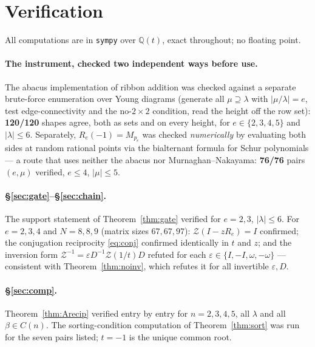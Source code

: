 \documentclass[11pt]{article}
\theoremstyle{definition}
\theoremstyle{remark}
\newcommand{\Q}{\mathbb{Q}}
\newcommand{\Mult}[1]{M_{#1}}
\newcommand{\Zc}{\mathcal{Z}}
\begin{document}
\section{Verification}\label{sec:verif}

All computations are in \texttt{sympy} over $\Q(t)$, exact throughout; no floating point.

\paragraph{The instrument, checked two independent ways before use.}
The abacus implementation of ribbon addition was checked against a separate brute-force
enumeration over Young diagrams (generate all $\mu\supseteq\lambda$ with $|\mu/\lambda|=e$,
test edge-connectivity and the no-$2\times2$ condition, read the height off the row set):
\textbf{120/120} shapes agree, both as sets and on every height, for $e\in\{2,3,4,5\}$ and
$|\lambda|\le6$.  Separately, $R_e(-1)=\Mult{p_e}$ was checked \emph{numerically} by
evaluating both sides at random rational points via the bialternant formula for Schur
polynomials --- a route that uses neither the abacus nor Murnaghan--Nakayama:
\textbf{76/76} pairs $(e,\mu)$ verified, $e\le4$, $|\mu|\le5$.

\paragraph{\S\ref{sec:gate}--\S\ref{sec:chain}.}
The support statement of Theorem~\ref{thm:gate} verified for $e=2,3$, $|\lambda|\le6$.
For $e=2,3,4$ and $N=8,8,9$ (matrix sizes $67,67,97$): $\Zc(I-zR_e)=I$ confirmed;
the conjugation reciprocity \eqref{eq:conj} confirmed identically in $t$ and $z$; and the
inversion form $\Zc^{-1}=\varepsilon D^{-1}\Zc(1/t)D$ refuted for each
$\varepsilon\in\{I,-I,\omega,-\omega\}$ --- consistent with Theorem~\ref{thm:noinv}, which
refutes it for all invertible $\varepsilon,D$.

\paragraph{\S\ref{sec:comp}.}
Theorem~\ref{thm:Arecip} verified entry by entry for $n=2,3,4,5$, all $\lambda$ and all
$\beta\in C(n)$.  The sorting-condition computation of Theorem~\ref{thm:sort} was run for the
seven pairs listed; $t=-1$ is the unique common root.
\end{document}
